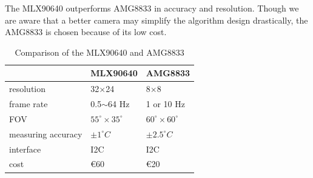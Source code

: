 The MLX90640 outperforms AMG8833 in accuracy and resolution. Though we are aware that a better camera may simplify the algorithm design drastically, the AMG8833 is chosen because of its low cost.
\begin{table}[]
\caption{Comparison of the MLX90640 and AMG8833}\label{tab:ircameras}
\centering
\begin{tabular}{lll}
                                      & MLX90640                                      & AMG8833                  \\ \hline
\multicolumn{1}{l|}{resolution}       & \multicolumn{1}{l|}{32$\times$24}             & 8$\times$8               \\
\multicolumn{1}{l|}{frame rate}       & \multicolumn{1}{l|}{0.5$\sim$64 Hz}           & 1 or 10 Hz               \\
\multicolumn{1}{l|}{FOV}              & \multicolumn{1}{l|}{$55^\circ\times35^\circ$} & $60^\circ\times60^\circ$ \\
\multicolumn{1}{l|}{measuring accuracy} & \multicolumn{1}{l|}{$\pm 1^\circ C$}        & $\pm 2.5^\circ C$        \\
\multicolumn{1}{l|}{interface}        & \multicolumn{1}{l|}{I2C}                      & I2C                      \\
\multicolumn{1}{l|}{cost}             & \multicolumn{1}{l|}{€60}                      & €20
\end{tabular}
\end{table}

